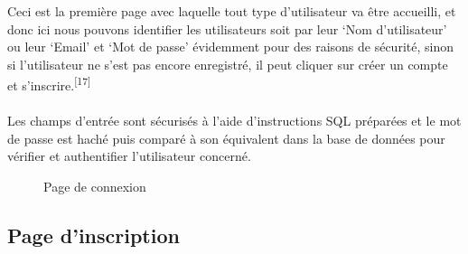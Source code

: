 \documentclass[12pt]{report}
\begin{document}
\vspace{0.2in}

Ceci est la première page avec laquelle tout type d'utilisateur va être accueilli, et donc ici nous pouvons identifier les utilisateurs soit par leur `Nom d'utilisateur' ou leur `Email' et `Mot de passe' évidemment pour des raisons de sécurité, sinon si l'utilisateur ne s'est pas encore enregistré, il peut cliquer sur créer un compte et s'inscrire.\textsuperscript{[17]}
\\\\
Les champs d'entrée sont sécurisés à l'aide d'instructions SQL préparées et le mot de passe est haché puis comparé à son équivalent dans la base de données pour vérifier et authentifier l'utilisateur concerné.

\vspace{0.8in}

\begin{figure}[h]
\centering
\caption{Page de connexion}
\end{figure}

\newpage

\subsection{Page d'inscription}

\vspace{0.2in}
\end{document}
